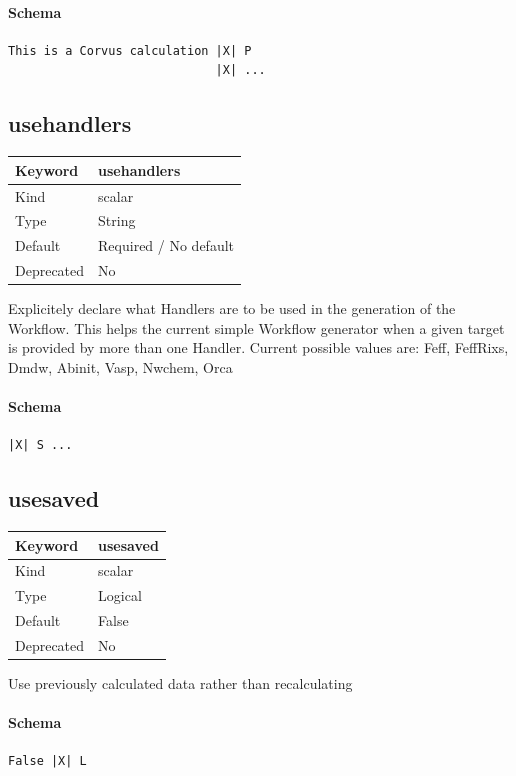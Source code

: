 \documentclass[11pt]{article}
\begin{document}
\paragraph{Schema}
\begin{Verbatim}
This is a Corvus calculation |X| P
                             |X| ...
\end{Verbatim}

\subsection{usehandlers}
\label{kw:usehandlers}
\begin{longtable}{|p{1.5in}|p{4.5in}|}
\hline
Keyword & usehandlers \\
\hline
Kind & scalar \\
\hline
Type & String \\
\hline
Default & Required / No default \\
\hline
Deprecated & No \\
\hline
\end{longtable}
 Explicitely declare what Handlers are to be used in the generation of the
 Workflow. This helps the current simple Workflow generator when a given target
 is provided by more than one Handler.
 Current possible values are:
    Feff, FeffRixs, Dmdw, Abinit, Vasp, Nwchem, Orca

\paragraph{Schema}
\begin{Verbatim}
|X| S ...
\end{Verbatim}

\subsection{usesaved}
\label{kw:usesaved}
\begin{longtable}{|p{1.5in}|p{4.5in}|}
\hline
Keyword & usesaved \\
\hline
Kind & scalar \\
\hline
Type & Logical \\
\hline
Default & False \\
\hline
Deprecated & No \\
\hline
\end{longtable}
 Use previously calculated data rather than recalculating

\paragraph{Schema}
\begin{Verbatim}
False |X| L
\end{Verbatim}
\end{document}
